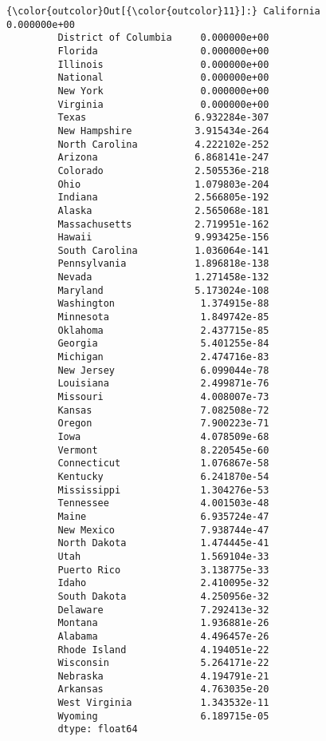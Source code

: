 \documentclass[11pt]{article}
\begin{document}
\begin{Verbatim}[commandchars=\\\{\}]
{\color{outcolor}Out[{\color{outcolor}11}]:} California               0.000000e+00
         District of Columbia     0.000000e+00
         Florida                  0.000000e+00
         Illinois                 0.000000e+00
         National                 0.000000e+00
         New York                 0.000000e+00
         Virginia                 0.000000e+00
         Texas                   6.932284e-307
         New Hampshire           3.915434e-264
         North Carolina          4.222102e-252
         Arizona                 6.868141e-247
         Colorado                2.505536e-218
         Ohio                    1.079803e-204
         Indiana                 2.566805e-192
         Alaska                  2.565068e-181
         Massachusetts           2.719951e-162
         Hawaii                  9.993425e-156
         South Carolina          1.036064e-141
         Pennsylvania            1.896818e-138
         Nevada                  1.271458e-132
         Maryland                5.173024e-108
         Washington               1.374915e-88
         Minnesota                1.849742e-85
         Oklahoma                 2.437715e-85
         Georgia                  5.401255e-84
         Michigan                 2.474716e-83
         New Jersey               6.099044e-78
         Louisiana                2.499871e-76
         Missouri                 4.008007e-73
         Kansas                   7.082508e-72
         Oregon                   7.900223e-71
         Iowa                     4.078509e-68
         Vermont                  8.220545e-60
         Connecticut              1.076867e-58
         Kentucky                 6.241870e-54
         Mississippi              1.304276e-53
         Tennessee                4.001503e-48
         Maine                    6.935724e-47
         New Mexico               7.938744e-47
         North Dakota             1.474445e-41
         Utah                     1.569104e-33
         Puerto Rico              3.138775e-33
         Idaho                    2.410095e-32
         South Dakota             4.250956e-32
         Delaware                 7.292413e-32
         Montana                  1.936881e-26
         Alabama                  4.496457e-26
         Rhode Island             4.194051e-22
         Wisconsin                5.264171e-22
         Nebraska                 4.194791e-21
         Arkansas                 4.763035e-20
         West Virginia            1.343532e-11
         Wyoming                  6.189715e-05
         dtype: float64
\end{Verbatim}
            

    
    
    
    
\end{document}
